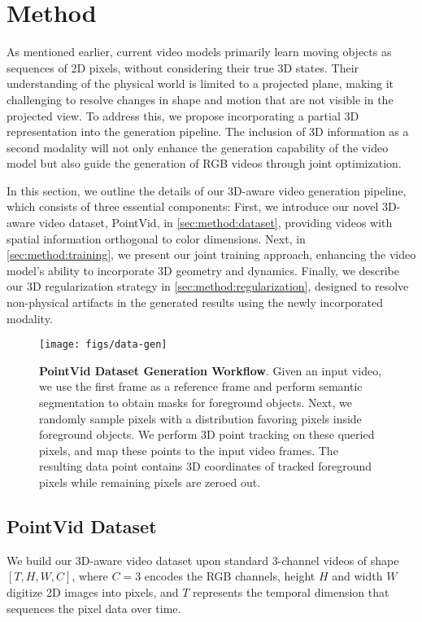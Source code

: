 \section{Method}
As mentioned earlier, current video models primarily learn moving objects as sequences of 2D pixels, without considering their true 3D states. Their understanding of the physical world is limited to a projected plane, making it challenging to resolve changes in shape and motion that are not visible in the projected view. To address this, we propose incorporating a partial 3D representation into the generation pipeline. The inclusion of 3D information as a second modality will not only enhance the generation capability of the video model but also guide the generation of RGB videos through joint optimization.


In this section, we outline the details of our 3D-aware video generation pipeline, which consists of three essential components: First, we introduce our novel 3D-aware video dataset, PointVid, in \autoref{sec:method:dataset}, providing videos with spatial information orthogonal to color dimensions. Next, in \autoref{sec:method:training}, we present our joint training approach, enhancing the video model’s ability to incorporate 3D geometry and dynamics. Finally, we describe our 3D regularization strategy in \autoref{sec:method:regularization}, designed to resolve non-physical artifacts in the generated results using the newly incorporated modality.

\begin{figure}
\texttt{[image: figs/data-gen]}
\caption{\textbf{PointVid Dataset Generation Workflow}. Given an input video, we use the first frame as a reference frame and perform semantic segmentation to obtain masks for foreground objects. Next, we randomly sample pixels with a distribution favoring pixels inside foreground objects. We perform 3D point tracking on these queried pixels, and map these points to the input video frames. The resulting data point contains 3D coordinates of tracked foreground pixels while remaining pixels are zeroed out.}\label{fig:data-gen}
\end{figure}

\subsection{PointVid Dataset}\label{sec:method:dataset}
We build our 3D-aware video dataset upon standard 3-channel videos of shape $[T, H, W, C]$, where $C=3$ encodes the RGB channels, height $H$ and width $W$ digitize 2D images into pixels, and $T$ represents the temporal dimension that sequences the pixel data over time.

